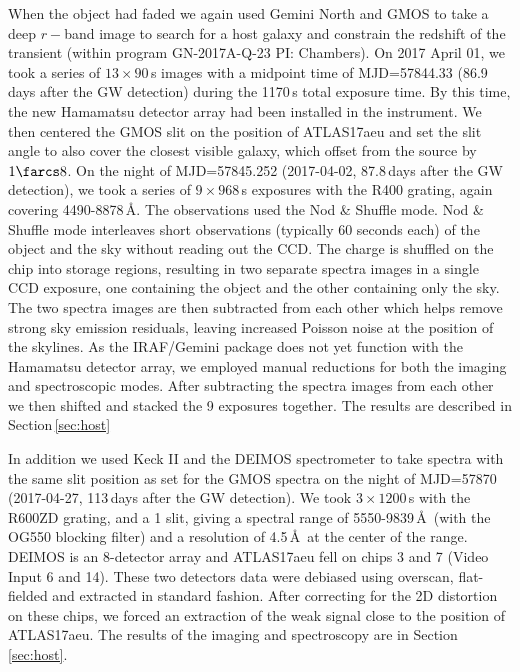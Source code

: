 \documentclass[twocolumn]{aastex61}
\begin{document}
When the object had faded we again used Gemini North and GMOS to take a deep $r-$band
image to search for a host galaxy and constrain the redshift of the transient (within program GN-2017A-Q-23 PI: Chambers).
On 2017 April 01, we took a series of  $13\times90$\,s images with a midpoint time of MJD=57844.33 (86.9\,days after the GW detection) during the 1170\,s total exposure time. 
By this time, the new Hamamatsu detector array had been installed in the instrument.
We then  centered the GMOS slit on the position of ATLAS17aeu and set the slit angle to 
also cover the closest visible galaxy, which offset from the source by $1\farcs8$.
On the night of MJD=57845.252 (2017-04-02, 87.8\,days after the GW detection), we took a series of  $9\times 968$\,s exposures  
with the R400 grating, again covering 4490-8878\,\AA. 
The observations used the Nod \& Shuffle mode.  
Nod \& Shuffle mode interleaves short observations 
(typically 60 seconds each) of the object and the sky without reading out the CCD.  The charge is shuffled  on the chip 
into storage regions,  resulting in two separate spectra images in a single CCD exposure,
one containing the object and the other
containing only the sky.   
The two spectra images are then subtracted 
from each other which helps 
remove strong sky emission residuals, 
leaving increased Poisson noise at the position of the skylines.  
As the IRAF/Gemini package does not yet function with the Hamamatsu detector array, 
we employed manual reductions for both the imaging and spectroscopic modes.  After subtracting 
the spectra images from each other we then shifted and 
stacked the 9 exposures together.  
The results are described in Section\,\ref{sec:host}

In addition we used Keck II and the DEIMOS spectrometer to take 
spectra with the same slit position as set for the GMOS spectra on the 
night of MJD=57870 (2017-04-27, 113\,days after the GW detection). We took $3\times1200$\,s with the 
R600ZD grating, and a 1 slit,  giving a spectral range of 
5550-9839\,\AA\ (with the OG550 blocking filter) 
and a resolution of 4.5\,\AA\ at the center of the range.  
DEIMOS is an 8-detector array and ATLAS17aeu fell on chips 3 and 7 (Video Input 6 and 14). These two detectors 
data were debiased using overscan, flat-fielded and 
extracted in standard fashion.
After correcting for the 2D distortion on these chips, we forced an extraction
of the weak signal close to the position of ATLAS17aeu. 
The results of the imaging and spectroscopy are in Section\,\ref{sec:host}. 
\end{document}
